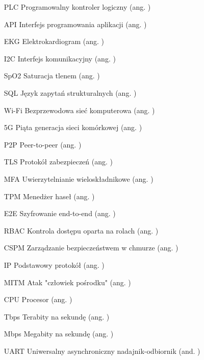 \begin{itemize}
\item[PLC] Programowalny kontroler logiczny (ang. )
\item[API] Interfejs programowania aplikacji (ang. )
\item[EKG] Elektrokardiogram (ang. ) 
\item[I2C] Interfejs komunikacyjny (ang. )
\item[SpO2] Saturacja tlenem (ang. )
\item[SQL] Język zapytań strukturalnych (ang. )
\item[Wi-Fi] Bezprzewodowa sieć komputerowa (ang. )
\item[5G] Piąta generacja sieci komórkowej (ang. )
\item[P2P] Peer-to-peer (ang. )
\item[TLS] Protokół zabezpieczeń (ang. )
\item[MFA] Uwierzytelnianie wieloskładnikowe (ang. )
\item[TPM] Menedżer haseł (ang. )
\item[E2E] Szyfrowanie end-to-end (ang. ) 
\item[RBAC] Kontrola dostępu oparta na rolach (ang. )
\item[CSPM] Zarządzanie bezpieczeństwem w chmurze (ang. )
\item[IP]  Podstawowy protokół (ang. )
\item[MITM]  Atak "człowiek pośrodku" (ang. )
\item[CPU]  Procesor (ang. )
\item[Tbps]  Terabity na sekundę (ang. )
\item[Mbps]  Megabity na sekundę (ang. )
\item[UART]  Uniwersalny asynchroniczny nadajnik-odbiornik (and. )
\end{itemize}